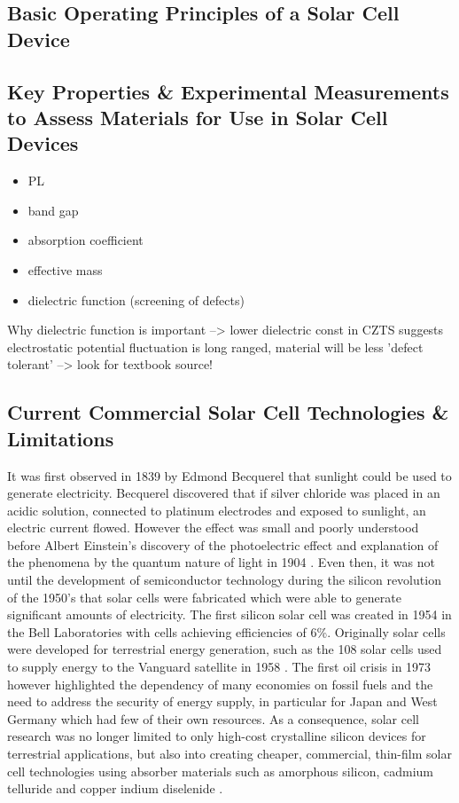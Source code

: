 \subsection{Basic Operating Principles of a Solar Cell Device}

\subsection{Key Properties \& Experimental Measurements to Assess Materials for Use in Solar Cell Devices}\label{PV_properties}
\begin{itemize}
\item PL
\item band gap
\item absorption coefficient
\item effective mass
\item dielectric function (screening of defects)
\end{itemize}
 Why dielectric function is important --> lower dielectric const in CZTS suggests electrostatic potential fluctuation is long ranged, material will be less 'defect tolerant' 
--> look for textbook source!


\subsection{Current Commercial Solar Cell Technologies \& Limitations}
It was first observed in 1839 by Edmond Becquerel that sunlight could be used to generate electricity. Becquerel discovered that if  silver chloride was placed in an acidic solution, connected to platinum electrodes and exposed to sunlight, an electric current flowed. However the effect was small and poorly understood before Albert Einstein's discovery of the photoelectric effect and explanation of the phenomena by the quantum nature of light in 1904 \cite{PV_history1}. Even then, it was not until the development of semiconductor technology during the silicon revolution of the 1950's that solar cells were fabricated which were able to generate significant amounts of electricity. The first silicon solar cell was created in 1954 in the Bell Laboratories with cells achieving efficiencies of 6\%. 
Originally solar cells were developed for terrestrial energy generation, such as the 108 solar cells used to supply energy to the Vanguard satellite in 1958 \cite{PV_history1}. The first oil crisis in 1973 however highlighted the dependency of many economies on fossil fuels and the need to address the security of energy supply,  in particular for Japan and West Germany which had few of their own resources. As a consequence, solar cell research was no longer limited to only high-cost crystalline silicon devices for terrestrial applications, but also into creating cheaper, commercial, thin-film solar cell technologies using absorber materials such as amorphous silicon, cadmium telluride and copper indium diselenide  \cite{PV_history2}.\\

